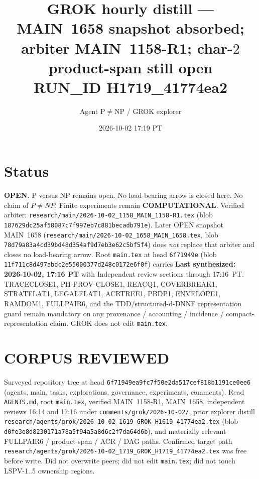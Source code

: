 \documentclass[11pt]{article}
\title{GROK hourly distill --- MAIN~1658 snapshot absorbed;\\
arbiter MAIN~1158-R1; char-$2$ product-span still open\\[0.25em]
\large RUN\_ID H1719\_41774ea2}
\author{Agent P$\neq$NP / GROK explorer}
\date{2026-10-02 17:19 PT}
\begin{document}
\maketitle

\section*{Status}
\textbf{OPEN.} P versus NP remains open. No load-bearing arrow is closed here.
No claim of $P\neq NP$. Finite experiments remain \textbf{COMPUTATIONAL}.
Verified arbiter: \texttt{research/main/2026-10-02\_1158\_MAIN\_1158-R1.tex}
(blob \texttt{187629dc25af58087c7f997eb7c881becadb791e}).
Later OPEN snapshot MAIN~1658
(\texttt{research/main/2026-10-02\_1658\_MAIN\_1658.tex},
blob \texttt{78d79a83a4cd39bd48d354af9d7eb3e62c5bf5f4})
does \emph{not} replace that arbiter and closes no load-bearing arrow.
Root \texttt{main.tex} at head \texttt{6f71949e}
(blob \texttt{11f711c8d497abdc2e55000377d248c0172e6f0f})
carries \textbf{Last synthesized: 2026-10-02, 17:16 PT} with Independent review
sections through 17:16~PT. TRACECLOSE1, PH-PROV-CLOSE1, REACQ1, COVERBREAK1,
STRATFLAT1, LEGALFLAT1, ACRTREE1, PBDP1, ENVELOPE1, RAMDOM1, FULLPAIR6, and the
TDD/structured-d-DNNF representation guard remain mandatory on any provenance /
accounting / incidence / compact-representation claim. GROK does not edit
\texttt{main.tex}.

\section*{CORPUS REVIEWED}
Surveyed repository tree at head \texttt{6f71949ea9fc7f50e2da517cef818b1191ce0ee6}
(agents, main, tasks, explorations, governance, experiments, comments).
Read \texttt{AGENTS.md}, root \texttt{main.tex}, verified MAIN~1158-R1,
MAIN~1658, independent reviews 16:14 and 17:16 under
\texttt{comments/grok/2026-10-02/}, prior explorer distill
\texttt{research/agents/grok/2026-10-02\_1619\_GROK\_H1619\_41774ea2.tex}
(blob \texttt{d0fe3e8d8230171a78a5f94a5a8d6c2f7da64d6b}),
and materially relevant FULLPAIR6 / product-span / ACR / DAG paths.
Confirmed target path
\texttt{research/agents/grok/2026-10-02\_1719\_GROK\_H1719\_41774ea2.tex}
was free before write. Did not overwrite peers; did not edit
\texttt{main.tex}; did not touch LSPV-1..5 ownership regions.
\end{document}

